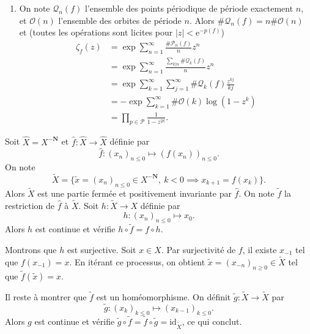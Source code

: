 \documentclass[a4paper,12pt,openany]{article}
\theoremstyle{plain}
\theoremstyle{definition}
\newcommand{\e}{\mathrm{e}}
\newcommand{\N}{\mathbf{N}}
\begin{document}
\begin{enumerate}
\begin{enumerate}
\end{enumerate}

\item On note $\mathcal{Q}_n(f)$ l'ensemble des points p\'eriodique de p\'eriode exactement $n$, et $\mathcal{O}(n)$ l'ensemble des orbites de p\'eriode $n$. Alors $\# \mathcal{Q}_n(f) = n \# \mathcal{O}(n)$ et (toutes les op\'erations sont licites pour $|z| < \e^{-p(f)}$)
$$
\begin{aligned}
\zeta_f(z) &= \exp \sum_{n=1}^\infty \frac{\#\mathcal{P}_n(f)}{n} z^n \\
&= \exp \sum_{n=1}^\infty \frac{\sum_{k|n} \#\mathcal{Q}_k(f)}{n}z^n \\
&= \exp \sum_{k=1}^\infty \sum_{j=1}^\infty \#\mathcal{Q}_k(f)\frac{z^{kj}}{kj} \\
& = -\exp \sum_{k=1} ^\infty  \#\mathcal{O}(k) \log(1-z^k) \\
& = \prod_{p \in \mathcal{P}} \frac{1}{1 - z^{|p|}}.
\end{aligned}
$$

\end{enumerate}

\vspace{0.6cm}

 \vspace{1.5mm} 


Soit $\hat X = X^{-\N}$ et $\hat f : \hat X \to \hat X$ d\'efinie par 
$$
\hat f : (x_n)_{n \leq 0} \mapsto (f(x_n))_{n \leq 0}.
$$
On note 
$$
\tilde X = \{\tilde x = (x_n)_{n\leq 0} \in X^{-\N},~k<0 \implies x_{k+1} = f(x_k) \}.
$$
Alors $\tilde X$ est une partie ferm\'ee et positivement invariante par $\hat f$. On note $\widetilde f$ la restriction de $\hat f$ \`a $\tilde X$. Soit $h : \tilde X \to X$ d\'efinie par 
$$h : (x_n)_{n\leq0} \mapsto x_0.$$
 Alors $h$ est continue et v\'erifie $h \circ \tilde f = f \circ h$. 

Montrons que $h$ est surjective. Soit $x \in X$. Par surjectivit\'e de $f$, il existe $x_{-1}$ tel que $f(x_{-1}) = x$. En it\'erant ce processus, on obtient $\tilde x = (x_{-n})_{n \geq 0} \in \tilde X$ tel que $\tilde f( \tilde x) = x$. 

Il reste \`a montrer que $\tilde f$ est un hom\'eomorphisme. On d\'efinit $ \tilde g : \tilde X \to \tilde X$ par 
$$
\tilde g : (x_k)_{k \leq 0} \mapsto (x_{k-1})_{k \leq 0}.
$$
Alors $g$ est continue et v\'erifie $\tilde g \circ \tilde f = \tilde f \circ \tilde g = \mathrm{id}_{\tilde X}$, ce qui conclut.
\end{document}
